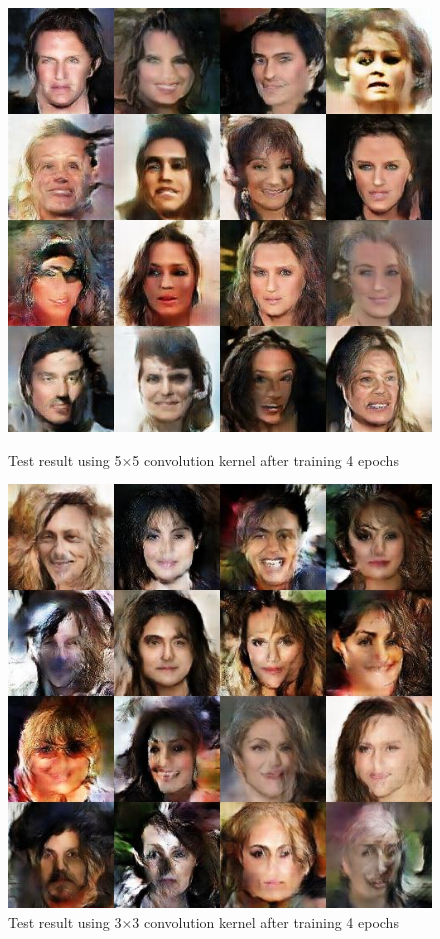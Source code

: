 \begin{figure}
    \begin{minipage}[t]{0.48\linewidth}
        \centering
        \includegraphics[width=\textwidth]{figures/result_conv_kernel_5.png}
        \caption{Test result using 5×5 convolution kernel after training 4 epochs}
        \label{conv_kernel_5}
    \end{minipage}
        \hfill
    \begin{minipage}[t]{0.48\linewidth}
        \centering
        \includegraphics[width=\textwidth]{figures/result_conv_kernel_3.png}
        \caption{Test result using 3×3 convolution kernel after training 4 epochs}
        \label{conv_kernel_3}
    \end{minipage}
\end{figure}
